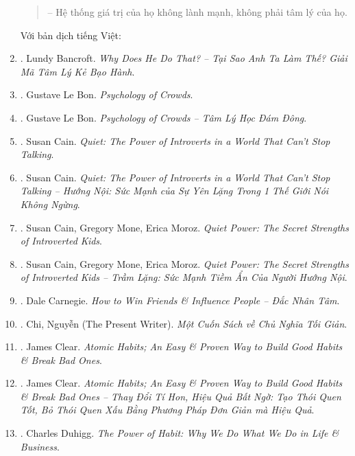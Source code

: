 \documentclass{article}
\begin{document}
\begin{enumerate}
\begin{quotation}
		-- Hệ thống giá trị của họ không lành mạnh, không phải tâm lý của họ.
	\end{quotation}
	Với bản dịch tiếng Việt:
	\item \cite{Bancroft_why_he_do_VN}. Lundy Bancroft. {\it Why Does He Do That? -- Tại Sao Anh Ta Làm Thế? Giải Mã Tâm Lý Kẻ Bạo Hành}.\hfill{\sf[done]}
	\item \cite{Bon_crowd_psychology}. {\sc Gustave Le Bon}. {\it Psychology of Crowds}.
	\item \cite{Bon_crowd_psychology_VN}. {\sc Gustave Le Bon}. {\it Psychology of Crowds -- Tâm Lý Học Đám Đông}.\hfill{\sf[done]}
	\item \cite{Cain_quiet}. Susan Cain. {\it Quiet: The Power of Introverts in a World That Can't Stop Talking}.\hfill{\sf[reading]}
	\item \cite{Cain_quiet_VN}. Susan Cain. {\it Quiet: The Power of Introverts in a World That Can't Stop Talking -- Hướng Nội: Sức Mạnh của Sự Yên Lặng Trong 1 Thế Giới Nói Không Ngừng}.\hfill{\sf[done]}
	\item \cite{Cain_Mone_Moroz_quiet_power}. Susan Cain, Gregory Mone, Erica Moroz. {\it Quiet Power: The Secret Strengths of Introverted Kids}.\hfill{\sf[reading]}
	\item \cite{Cain_Mone_Moroz_quiet_power_VN}. Susan Cain, Gregory Mone, Erica Moroz. {\it Quiet Power: The Secret Strengths of Introverted Kids -- Trầm Lặng: Sức Mạnh Tiềm Ẩn Của Người Hướng Nội}.\hfill{\sf[done]}
	\item \cite{Carnegie2021}. Dale Carnegie. {\it How to Win Friends \& Influence People -- Đắc Nhân Tâm}.\hfill{\sf[done]}
	\item \cite{Chi2022}. Chi, Nguyễn (The Present Writer). {\it Một Cuốn Sách về Chủ Nghĩa Tối Giản}. \hfill{\sf[done]}
	\item \cite{Clear_habit}. James Clear. {\it Atomic Habits; An Easy \& Proven Way to Build Good Habits \& Break Bad Ones}.\hfill{\sf[reading]}
	\item \cite{Clear_habit_VN}. James Clear. {\it Atomic Habits; An Easy \& Proven Way to Build Good Habits \& Break Bad Ones -- Thay Đổi Tí Hon, Hiệu Quả Bất Ngờ: Tạo Thói Quen Tốt, Bỏ Thói Quen Xấu Bằng Phương Pháp Đơn Giản mà Hiệu Quả}.\hfill{\sf[done]}
	\item \cite{Duhigg_habit}. {\sc Charles Duhigg}. {\it The Power of Habit: Why We Do What We Do in Life \& Business}.
	

\end{enumerate}
\end{document}
